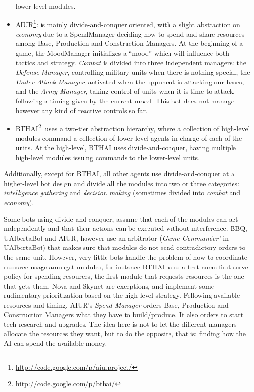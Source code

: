 \documentclass{llncs}
\begin{document}
\begin{itemize}
  lower-level modules.
\item  AIUR\footnote{\url{http://code.google.com/p/aiurproject/}}:  is
  mainly divide-and-conquer oriented,
  with a  slight abstraction on  {\em economy} due to a  SpendManager deciding
  how  to  spend  and  share  resources  among  Base,  Production  and
  Construction Managers.  At the beginning of a  game, the MoodManager
  initializes  a  ``mood''  which  will  influence  both  tactics  and
  strategy. {\em Combat} is divided into three  independent managers: the
  {\em  Defense Manager},  controlling  military units  when there  is
  nothing special, the {\em  Under Attack Manager}, activated when the
  opponent is attacking our bases,  and the {\em Army Manager}, taking
  control of units when it is time to attack, following a timing given
  by the  current mood. This bot  does not manage however  any kind of
  reactive controls so far.
\item  BTHAI\footnote{\url{http://code.google.com/p/bthai/}}:  uses  a
  two-tier  abstraction hierarchy,  where a  collection  of high-level
  modules command a collection of lower-level agents in charge of each
  of  the units.  At  the high-level,  BTHAI uses  divide-and-conquer,
  having   multiple  high-level  modules   issuing  commands   to  the
  lower-level units.
\end{itemize}

Additionally, except for BTHAI, all other agents use divide-and-conquer at a higher-level bot design and divide all the modules into two or three categories: {\em intelligence gathering} and {\em decision making} (sometimes divided into {\em combat} and {\em economy}).

Some bots  using divide-and-conquer, assume  that each of  the modules
can act independently  and that their actions can  be executed without
interference.  BBQ,  UAlbertaBot and  AIUR, however use  an arbitrator
({\em Game Commander'} in UAlbertaBot) that makes sure that modules do
not send contradictory orders to  the same unit.  However, very little
bots handle  the problem of  how to coordinate resource  usage amongst
modules, for  instance BTHAI uses a  first-come-first-serve policy for
spending resources,  the first module  that requests resources  is the
one that gets them. Nova and Skynet are exceptions, and implement some
rudimentary prioritization based on the high level strategy. Following
available  resources and  timing,  AIUR's {\em  Spend Manager}  orders
Base,  Production   and  Construction  Managers  what   they  have  to
build/produce. It also orders to start tech research and upgrades. The
idea here is not to let the different managers allocate the resources they want, but to do the opposite, that is: finding how the AI can
spend the available money.
\end{document}
